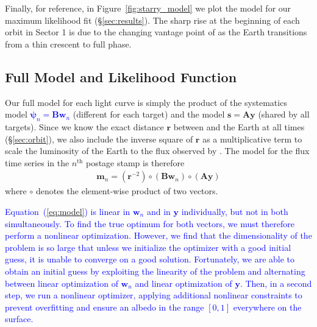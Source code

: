 \documentclass[modern]{aastex62}
\newcommand{\edited}[1]{\textcolor{blue}{#1}}
\begin{document}
Finally, for reference, in Figure~\ref{fig:starry_model} we plot the
\starry model for our maximum likelihood fit (\S\ref{sec:results}). The
sharp rise at the beginning of each orbit in Sector 1 is due to the changing
vantage point of \TESS as the Earth transitions from a thin crescent to full phase.

\subsection{Full Model and Likelihood Function}
\label{sec:model}

Our full model for each light curve is simply the product of the 
systematics model 
\edited{$\boldsymbol{\psi}_n = \mathbf{B}\mathbf{w}_n$}
 (different for each target) and
the \starry model $\mathbf{s} = \mathbf{A}\mathbf{y}$ (shared by all targets). Since we 
know the exact distance $\mathbf{r}$ between \TESS and the Earth at all times
(\S\ref{sec:orbit}), we also include the inverse square of $\mathbf{r}$ 
as a multiplicative term to scale the luminosity 
of the Earth to the flux observed by \TESS. The model for the flux time series
in the $n^\mathrm{th}$ postage stamp is therefore
%
\begin{align}
    \label{eq:model}
    \mathbf{m}_n = (\mathbf{r}^{-2}) \circ (\mathbf{B} \mathbf{w}_n) \circ (\mathbf{A} \mathbf{y})
\end{align}
%
where $\circ$ denotes the element-wise product of two vectors.

\edited{%
Equation~(\ref{eq:model}) is linear in $\mathbf{w}_n$ and in $\mathbf{y}$
individually, but not in both simultaneously. To find the true optimum for
both vectors, we must therefore perform a nonlinear optimization. However, we find that 
the dimensionality of the problem is so large that unless we initialize the 
optimizer with a good initial guess, it is unable to converge on a good solution.
Fortunately, we are able to obtain an initial guess by exploiting the
linearity of the problem and alternating between linear optimization of $\mathbf{w}_n$
and linear optimization of $\mathbf{y}$. Then, in a second step, we run a
nonlinear optimizer, applying additional nonlinear constraints to prevent overfitting and ensure
an albedo in the range $[0, 1]$ everywhere on the surface.
}
\end{document}
